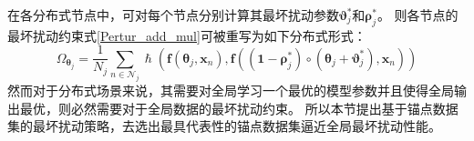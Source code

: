 {在各分布式节点中，可对每个节点}分别计算其最坏扰动参数$\boldsymbol \vartheta_j^* $和$\boldsymbol \rho_j^*$。
则各节点的最坏扰动约束式\eqref{Pertur_add_mul}可被重写为如下分布式形式：
\begin{equation}
    \label{Pertur_add_mul_distributed}
    \Omega_{\boldsymbol\theta_j}=
    \frac{1}{N_j} \sum_{n \in \mathcal{N}_j}
    \hslash\left(\boldsymbol f\left(\boldsymbol\theta_j,\boldsymbol x_n\right),
    \boldsymbol f\left(\left(\boldsymbol 1-\boldsymbol \rho_j^*\right)\circ
    \left(\boldsymbol \theta_j+\boldsymbol \vartheta_j^* \right),\boldsymbol x_n\right)\right)
\end{equation}
然而对于分布式场景来说，其需要对全局学习一个最优的模型参数并且使得全局输出最优，则必然需要对于全局数据的最坏扰动约束。
所以本节提出基于锚点数据集的最坏扰动策略，去选出最具代表性的锚点数据集逼近全局最坏扰动性能。

